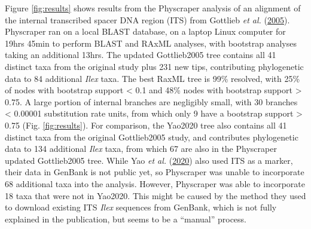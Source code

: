 \documentclass[]{article}
\begin{document}
Figure \ref{fig:results} shows results from the Physcraper analysis of an alignment of the internal transcribed spacer DNA region (ITS) from Gottlieb \emph{et al.} (\protect\hyperlink{ref-gottlieb2005molecular}{2005}). Physcraper ran on a local BLAST database, on a laptop Linux computer for 19hrs 45min to perform BLAST and RAxML analyses, with bootstrap analyses taking an additional 13hrs.
The updated Gottlieb2005 tree contains all 41 distinct taxa from the original study plus 231 new tips, contributing phylogenetic data to 84 additional \emph{Ilex} taxa. The best RaxML tree is 99\% resolved, with 25\% of nodes with bootstrap support \textless{} 0.1 and 48\% nodes with bootstrap support \textgreater{} 0.75.
A large portion of internal branches are negligibly small, with 30 branches \textless{} 0.00001 substitution rate units, from which only 9 have a bootstrap support \textgreater{} 0.75 (Fig. \ref{fig:results}).
For comparison, the Yao2020 tree also contains all 41 distinct taxa from the original Gottlieb2005 study,
and contributes phylogenetic data to 134 additional \emph{Ilex} taxa, from which
67 are also in the Physcraper updated Gottlieb2005 tree. While Yao \emph{et al.} (\protect\hyperlink{ref-yao2020phylogeny}{2020}) also used ITS as a marker, their data in GenBank is not public yet, so Physcraper was unable to incorporate 68 additional taxa into the analysis. However, Physcraper was able to incorporate 18 taxa that were not in Yao2020.
This might be caused by the method they used to download existing ITS \emph{Ilex} sequences from GenBank, which is not fully explained in the publication, but seems to be a ``manual'' process.
\end{document}
